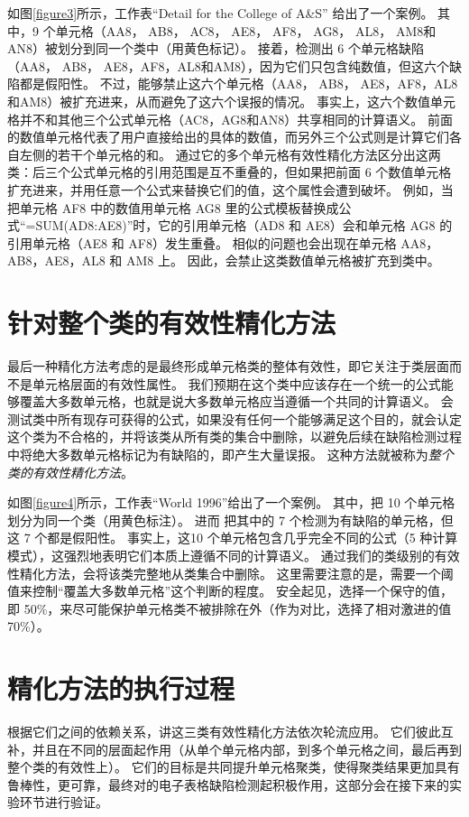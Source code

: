 如图\ref{figure3}所示，工作表“Detail for the College of A\&S” 给出了一个案例。
其中，9 个单元格（AA8， AB8， AC8， AE8， AF8， AG8， AL8， AM8和AN8）被\cu 划分到同一个类中（用黄色标记）。
接着，\cu 检测出 6 个单元格缺陷（AA8， AB8， AE8，AF8，AL8和AM8），因为它们只包含纯数值，但这六个缺陷都是假阳性。
不过，\wa 能够禁止这六个单元格（AA8， AB8， AE8，AF8，AL8和AM8）被扩充进来，从而避免了这六个误报的情况。
事实上，这六个数值单元格并不和其他三个公式单元格（AC8，AG8和AN8）共享相同的计算语义。
前面的数值单元格代表了用户直接给出的具体的数值，而另外三个公式则是计算它们各自左侧的若干个单元格的和。
\wa 通过它的多个单元格有效性精化方法区分出这两类：后三个公式单元格的引用范围是互不重叠的，但如果把前面 6 个数值单元格扩充进来，并用任意一个公式来替换它们的值，这个属性会遭到破坏。
例如，当把单元格 AF8 中的数值用单元格 AG8 里的公式模板替换成公式“=SUM(AD8:AE8)”时，它的引用单元格（AD8 和 AE8）会和单元格 AG8 的引用单元格（AE8 和 AF8）发生重叠。
相似的问题也会出现在单元格 AA8，AB8，AE8，AL8 和 AM8 上。
因此，\wa 会禁止这类数值单元格被扩充到类中。

\section{针对整个类的有效性精化方法}



最后一种精化方法考虑的是最终形成单元格类的整体有效性，即它关注于类层面而不是单元格层面的有效性属性。
我们预期在这个类中应该存在一个统一的公式能够覆盖大多数单元格，也就是说大多数单元格应当遵循一个共同的计算语义。
\wa 会测试类中所有现存可获得的公式，如果没有任何一个能够满足这个目的，\wa 就会认定这个类为不合格的，并将该类从所有类的集合中删除，以避免后续在缺陷检测过程中将绝大多数单元格标记为有缺陷的，即产生大量误报。
这种方法就被称为\textit{整个类的有效性精化方法}。

如图\ref{figure4}所示，工作表“World 1996”给出了一个案例。
其中，\cu 把 10 个单元格划分为同一个类（用黄色标注）。
进而 \cu 把其中的 7 个检测为有缺陷的单元格，但这 7 个都是假阳性。
事实上，这10 个单元格包含几乎完全不同的公式（5 种计算模式），这强烈地表明它们本质上遵循不同的计算语义。
通过我们的类级别的有效性精化方法，\wa 会将该类完整地从类集合中删除。
这里需要注意的是，\wa 需要一个阈值来控制“覆盖大多数单元格”这个判断的程度。
安全起见，\wa 选择一个保守的值，即 50\%，来尽可能保护单元格类不被排除在外（作为对比，\ca 选择了相对激进的值70\%）。

\section{精化方法的执行过程}

根据它们之间的依赖关系，\wa 讲这三类有效性精化方法依次轮流应用。
它们彼此互补，并且在不同的层面起作用（从单个单元格内部，到多个单元格之间，最后再到整个类的有效性上）。
它们的目标是共同提升单元格聚类，使得聚类结果更加具有鲁棒性，更可靠，最终对\wa 的电子表格缺陷检测起积极作用，这部分会在接下来的实验环节进行验证。